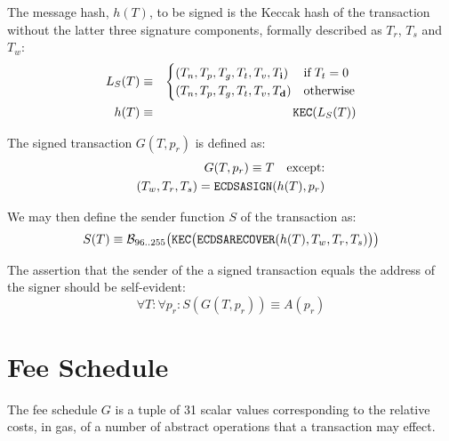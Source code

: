 \documentclass[9pt,oneside]{amsart}
\begin{document}
The message hash, $h(T)$, to be signed is the Keccak hash of the transaction without the latter three signature components, formally described as $T_r$, $T_s$ and $T_w$:
\begin{eqnarray}
L_S(T) & \equiv & \begin{cases}
(T_n, T_p, T_g, T_t, T_v, T_\mathbf{i}) & \text{if} \; T_t = 0\\
(T_n, T_p, T_g, T_t, T_v, T_\mathbf{d}) & \text{otherwise} 
\end{cases} \\
h(T) & \equiv & \mathtt{\small KEC}( L_S(T) )
\end{eqnarray}

The signed transaction $G(T, p_r)$ is defined as:
\begin{eqnarray}
G(T, p_r) \equiv T \quad \text{except:} \\
(T_w, T_r, T_s) = \mathtt{\small ECDSASIGN}(h(T), p_r)
\end{eqnarray}

We may then define the sender function $S$ of the transaction as:
\begin{equation}
S(T) \equiv \mathcal{B}_{96..255}\big(\mathtt{\tiny KEC}\big( \mathtt{\small ECDSARECOVER}(h(T), T_w, T_r, T_s) \big) \big)
\end{equation}

The assertion that the sender of the a signed transaction equals the address of the signer should be self-evident:
\begin{equation}
\forall T: \forall p_r: S(G(T, p_r)) \equiv A(p_r)
\end{equation}

\section{Fee Schedule}\label{app:fees}

The fee schedule $G$ is a tuple of 31 scalar values corresponding to the relative costs, in gas, of a number of abstract operations that a transaction may effect.
\end{document}

